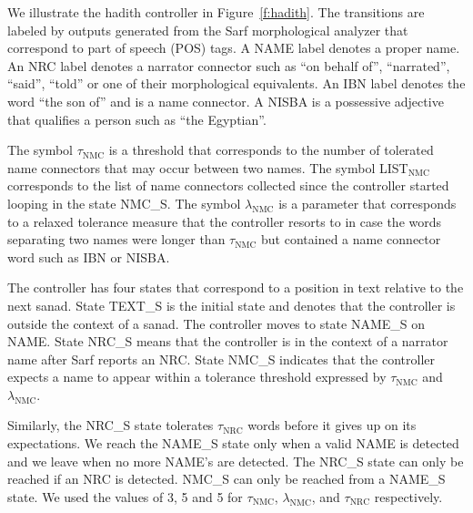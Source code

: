 \documentclass[a4,12pt]{report}
\begin{document}
We illustrate the hadith controller 
in Figure~\ref{f:hadith}. 
The transitions are labeled by outputs generated from 
the Sarf morphological analyzer that correspond to 
part of speech (POS) tags. 
A NAME label denotes a proper name.
An NRC label denotes a narrator connector such as
 ``on behalf of'',  ``narrated'',  ``said'', 
 ``told'' or one of their morphological equivalents. 
An IBN label denotes the word  ``the son of'' and is a name connector.
A NISBA is a possessive adjective that qualifies a person such 
as  ``the Egyptian''. 

The symbol $\tau_{\mbox{NMC}}$ is a threshold
that corresponds to the number of tolerated name connectors 
that may occur between two names. %
The symbol LIST$_{\mbox{NMC}}$ corresponds to the list 
of name connectors collected since the controller
started looping in the state NMC\_S. 
The symbol $\lambda_{\mbox{NMC}}$ is a parameter 
that corresponds to a relaxed tolerance measure that
the controller resorts to in case the words separating
two names were longer than $\tau_{\mbox{NMC}}$ but 
contained a name connector word such as IBN or NISBA.

The controller has four states that correspond to 
a position in text relative to the next sanad. 
State TEXT\_S is the initial state and denotes that
the controller is outside the context of a sanad.
The controller moves to state NAME\_S on
NAME.
State NRC\_S means that the controller is in the context
of a narrator name after Sarf reports an NRC.
State NMC\_S
indicates that the controller expects a name to appear within 
a tolerance threshold expressed by 
$\tau_{\mbox{NMC}}$ and $\lambda_{\mbox{NMC}}$.

Similarly, the NRC\_S state tolerates $\tau_{\mbox{NRC}}$ words 
before it gives up on its expectations. 
We reach the NAME\_S state only when a
valid NAME is detected and we leave when no more NAME's are detected.
The NRC\_S state can only be reached if an NRC is detected.
NMC\_S can only be reached from a NAME\_S state.
We used the values of 3, 5 and 5 for $\tau_{\mbox{NMC}}$, 
$\lambda_{\mbox{NMC}}$, and $\tau_{\mbox{NRC}}$ respectively.

\begin{figure}[tb!]
\end{figure}
\end{document}
